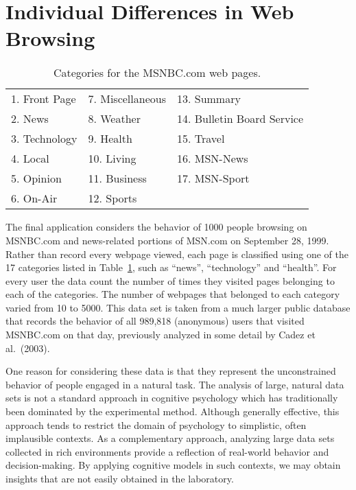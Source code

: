 \documentclass[authoryear]{elsarticle}
\newcommand{\tbsp}{\vspace*{-7pt}}
\begin{document}
\section{Individual Differences in Web Browsing}

\begin{table}
\begin{center}
\caption{Categories for the MSNBC.com web pages.}
\label{weblabels}
\begin{tabular}{lll}
\\ \hline
1. Front Page & 7. Miscellaneous & 13. Summary \tbsp \\
2. News & 8. Weather & 14. Bulletin Board Service \tbsp\\
3. Technology & 9. Health & 15. Travel \tbsp\\
4. Local & 10. Living & 16. MSN-News\tbsp\\
5. Opinion & 11. Business & 17. MSN-Sport \tbsp\\
6. On-Air & 12. Sports & \\
\hline
\end{tabular}
\vspace*{10pt}
\end{center}
\end{table}

The final application considers the behavior of 1000 people browsing
on MSNBC.com and news-related portions of MSN.com
on September 28, 1999. Rather than record every webpage viewed,
each page is classified using one of the 17 categories
listed in Table~\ref{weblabels}, such as ``news'', ``technology'' and
``health''. For every user the data count the number of times they
visited pages belonging to each of the categories. The number of webpages
that belonged to each category varied from 10 to 5000. This data set is
taken from a much larger public database that records the behavior
of all 989,818 (anonymous) users that visited MSNBC.com on that day,
previously analyzed in some detail by Cadez et al.\ (2003).

One reason for considering these data is that they represent the unconstrained
behavior of people engaged in a natural task. The analysis of large, natural
data sets is not a standard approach in cognitive psychology which has
traditionally been dominated by the experimental method. Although generally
effective, this approach tends to restrict the domain of psychology to simplistic,
often implausible contexts. As a complementary approach, analyzing large
data sets collected in rich environments provide a reflection of real-world
behavior and decision-making. By applying cognitive models in such contexts,
we may obtain insights that are not easily obtained in the laboratory.
\end{document}
